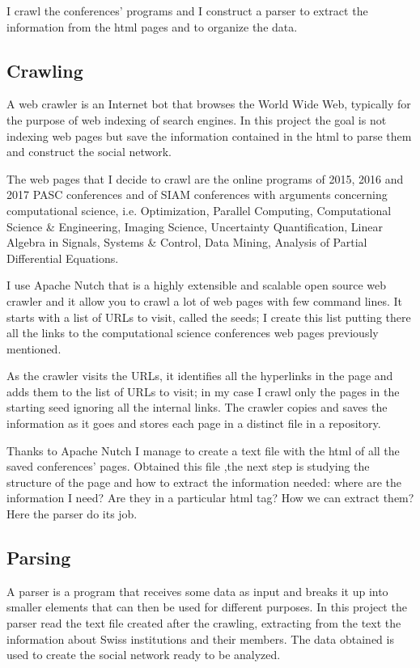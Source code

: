\documentclass[]{usiinfbachelorproject}
\begin{document}
I crawl the conferences' programs and I construct a parser to extract the information from the html pages and  to organize the data.

\subsection{Crawling}

A web crawler is an Internet bot that browses the World Wide Web, typically for the purpose of web indexing of search engines. In this project the goal is not indexing web pages but save the information contained in the html to parse them and construct the social network.

The web pages that I decide to crawl are the online programs of 2015, 2016 and 2017 PASC conferences and of SIAM conferences with arguments concerning computational science, i.e. Optimization, Parallel Computing, Computational Science \& Engineering, Imaging Science, Uncertainty Quantification, Linear Algebra in Signals, Systems \& Control, Data Mining, Analysis of Partial Differential Equations.

I use Apache Nutch that is a highly extensible and scalable open source web crawler and it allow you to crawl a lot of web pages with few command lines.
It starts with a list of URLs to visit, called the seeds; I create this list putting there all the links to the computational science conferences web pages previously mentioned.

As the crawler visits the URLs, it identifies all the hyperlinks in the page and adds them to the list of URLs to visit; in my case I crawl only the pages in the starting seed ignoring all the internal links. The crawler copies and saves the information as it goes and stores each page in a distinct file in a repository.

Thanks to Apache Nutch I manage to create a text file with the html of all the saved conferences' pages. Obtained this file ,the next step is studying the structure of the page and how to extract the information needed: where are the information I need? Are they in a particular html tag? How we can extract them? Here the parser do its job.

\subsection{Parsing}

A parser is a program that receives some data as input and breaks it up into smaller elements that can then be used for different purposes. In this project the parser read the text file created after the crawling, extracting from the text the information about Swiss institutions and their members. The data obtained is used to create the social network ready to be analyzed.
\end{document}
